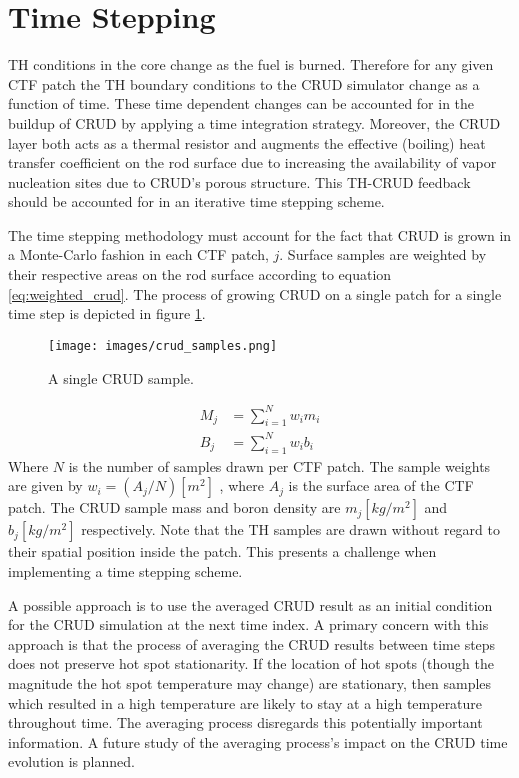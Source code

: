 \section{Time Stepping}

TH conditions in the core change as the fuel is burned.  Therefore for any given CTF patch the TH boundary conditions to the CRUD simulator change as a function of time.  These time dependent changes can be accounted for in the buildup of CRUD by applying a time integration strategy.  Moreover, the CRUD layer both acts as a thermal resistor and augments the effective (boiling) heat transfer coefficient on the rod surface due to increasing the availability of vapor nucleation sites due to CRUD's porous structure.  This TH-CRUD feedback should be accounted for in an iterative time stepping scheme.

The time stepping methodology must account for the fact that CRUD is grown in a Monte-Carlo fashion in each CTF patch, $j$.  Surface samples are weighted by their respective areas on the rod surface according to equation \ref{eq:weighted_crud}.  The process of growing CRUD on a single patch for a single time step is depicted in figure \ref{fig:crud_samples}.

\begin{figure}[hbtp]
\centering
\texttt{[image: images/crud\_samples.png]}
\caption{A single CRUD sample.}
\label{fig:crud_samples}
\end{figure}

\begin{align}
M_j &= \sum_{i=1}^N w_i m_{i} \\
B_j &= \sum_{i=1}^N w_i b_{i}
\label{eq:weighted_crud}
\end{align}
Where $N$ is the number of samples drawn per CTF patch.  The sample weights are given by $w_i = (A_j / N) [m^2]$ , where $A_j$ is the surface area of the CTF patch.  The CRUD sample mass and boron density are $m_j[kg/m^2]$ and $b_j [kg/m^2]$ respectively.  Note that the TH samples are drawn without regard to their spatial position inside the patch.  This presents a challenge when implementing a time stepping scheme.

A possible approach is to use the averaged CRUD result as an initial condition for the CRUD simulation at the next time index.
A primary concern with this approach is that the process of averaging the CRUD results between time steps does not preserve hot spot stationarity.  If the location of hot spots (though the magnitude the hot spot temperature may change) are stationary, then samples which resulted in a high temperature are likely to stay at a high temperature throughout time.  The averaging process disregards this potentially important information.  A future study of the averaging process's impact on the CRUD time evolution is planned. 

